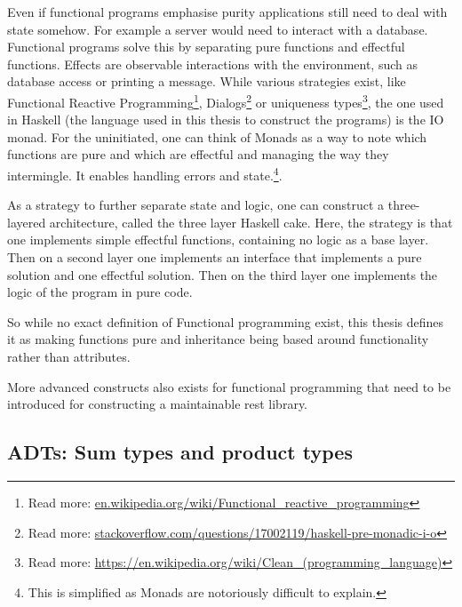 \begin{description}
Even if functional programs emphasise purity applications still need to deal
        with state somehow. For example a server would need to interact with a
        database. Functional programs solve this by separating pure functions
        and effectful functions. Effects are observable interactions with the
        environment, such as database access or printing a message.  While
        various strategies exist, like Functional Reactive
        Programming\footnote{Read more:
        \url{en.wikipedia.org/wiki/Functional_reactive_programming}},
        Dialogs\footnote{Read more:
        \url{stackoverflow.com/questions/17002119/haskell-pre-monadic-i-o}} or
        uniqueness types\footnote{Read more:
        \url{https://en.wikipedia.org/wiki/Clean_(programming_language)}}, the
        one used in Haskell (the language used in this thesis to construct the
        programs) is the IO monad. For the uninitiated, one can think of Monads
        as a way to note which functions are pure and which are effectful and
        managing the way they intermingle. It enables handling errors
        and state.\footnote{This is simplified as Monads are notoriously
        difficult to explain.}. 

As a strategy to further separate state and logic, one can construct a
        three-layered architecture, called the three layer Haskell cake. Here,
        the strategy is that one implements simple effectful functions,
        containing no logic as a base layer. Then on a second layer one
        implements an interface that implements a pure solution and one
        effectful solution. Then on the third layer one implements the logic of
        the program in pure code.  
\end{description}

So while no exact definition of Functional programming exist, this thesis
defines it as making functions pure and inheritance being based around
functionality rather than attributes. 

More advanced constructs also exists for functional programming that need to be
introduced for constructing a maintainable rest library. 

\subsection{ADTs: Sum types and product types}\label{types}

